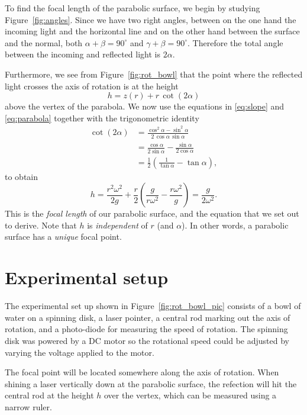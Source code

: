 \documentclass[12pt, a4paper, twocolumn]{article}
\begin{document}
To find the focal length of the parabolic surface, we begin by studying Figure~\ref{fig:angles}. Since we have two right angles, between on the one hand the incoming light and the horizontal line and on the other hand between the surface and the normal, both 
$\alpha+\beta = 90^\circ$ and $\gamma+\beta = 90^\circ$. 
Therefore the total angle between the incoming and reflected light is $2\alpha$. 

Furthermore, we see from Figure~\ref{fig:rot_bowl} that the point where the reflected light crosses the axis of rotation is at the height 
\begin{equation}
h= z(r) + r\,\cot(2\alpha)
\end{equation}
above the vertex of the parabola. We now use the equations in \eqref{eq:slope} and \eqref{eq:parabola} together with the trigonometric identity
\begin{equation}
\begin{aligned}
\cot(2\alpha)
&=\frac{\cos^2\alpha-\sin^2\alpha}{2\,\cos\alpha\,\sin\alpha}\\
&=\frac{\cos\alpha}{2\sin\alpha}-\frac{\sin\alpha}{2\cos\alpha}\\
&=\frac{1}{2}\left(\frac{1}{\tan\alpha} -\tan\alpha \right),
\end{aligned}
\end{equation}
to obtain
\begin{equation}\label{eq:focal_height}
h=\frac{r^2\omega^2}{2g} 
   + \frac{r}{2}\left(\frac{g}{r\omega^2} -\frac{r\omega^2}{g} \right)
=\frac{g}{2\omega^2}.
\end{equation}
This is the \emph{focal length} of our parabolic surface, and the equation that we set out to derive. Note that $h$ is \emph{independent} of $r$ (and $\alpha$). In other words, a parabolic surface has a \emph{unique} focal point.

\section{Experimental setup}

The experimental set up shown in Figure~\ref{fig:rot_bowl_pic} consists of a bowl of water on a spinning disk, a laser pointer, a central rod marking out the axis of rotation, and a photo-diode for measuring the speed of rotation. The spinning disk was powered by a DC motor so the rotational speed could be adjusted by varying the voltage applied to the motor. 

The focal point will be located somewhere along the axis of rotation. When shining a laser vertically down at the parabolic surface, the refection will hit the central rod at the height $h$ over the vertex, which can be measured using a narrow ruler. 
\end{document}
